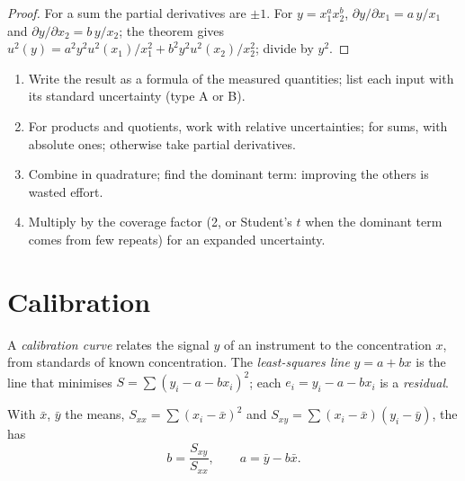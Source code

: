 \begin{proof}
For a sum the partial derivatives are $\pm1$. For $y = x_1^ax_2^b$, $\partial y/\partial x_1 =
a\,y/x_1$ and $\partial y/\partial x_2 = b\,y/x_2$; the theorem gives $u^2(y) = a^2y^2u^2(x_1)/x_1^2 +
b^2y^2u^2(x_2)/x_2^2$; divide by $y^2$.
\end{proof}

\begin{method}[Propagating]\label{met:b2:measurement-statistics:propagate}
\begin{enumerate}
  \item Write the result as a formula of the measured quantities; list each input with its standard
        uncertainty (type A or B).
  \item For products and quotients, work with relative uncertainties; for sums, with absolute ones;
        otherwise take partial derivatives.
  \item Combine in quadrature; find the dominant term: improving the others is wasted effort.
  \item Multiply by the coverage factor (2, or Student's $t$ when the dominant term comes from few
        repeats) for an expanded uncertainty.
\end{enumerate}
\end{method}

\section{Calibration}

\begin{definition}\label{def:b2:measurement-statistics:calibration}
A \emph{calibration curve} relates the signal $y$ of an instrument to the
concentration $x$, from standards of known concentration. The \emph{least-squares
line} $y = a + bx$ is the line that minimises $S = \sum (y_i - a -
bx_i)^2$; each $e_i = y_i - a - bx_i$ is a \emph{residual}.
\end{definition}

\begin{theorem}\label{thm:b2:measurement-statistics:least-squares}
With $\bar x$, $\bar y$ the means, $S_{xx} = \sum(x_i - \bar x)^2$ and $S_{xy} = \sum(x_i - \bar x)(y_i -
\bar y)$, the  has
\begin{equation*}
b = \frac{S_{xy}}{S_{xx}}, \qquad a = \bar y - b\bar x.
\end{equation*}
\end{theorem}

